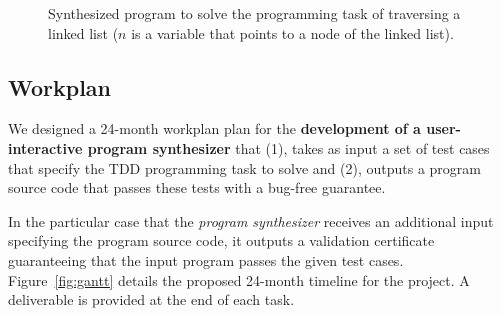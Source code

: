 \documentclass[10pt,a4paper]{paper}
\begin{document}
\begin{figure}[hbt!]
\begin{center}
\end{center}
\caption{\small Synthesized program to solve the programming task of traversing a linked list ($n$ is a variable that points to a node of the linked list).}
\label{fig:list}
\end{figure}



\subsection{Workplan}
We designed a 24-month workplan plan for the {\bf development of a user-interactive program synthesizer} that (1), takes as input a set of test cases that specify the TDD programming task to solve and (2), outputs a program source code that passes these tests with a bug-free guarantee.

In the particular case that the {\em program synthesizer} receives an additional input specifying the program source code, it outputs a validation certificate guaranteeing that the input program passes the given test cases. Figure~\ref{fig:gantt} details the proposed 24-month timeline for the project. A deliverable is provided at the end of each task.
\end{document}
